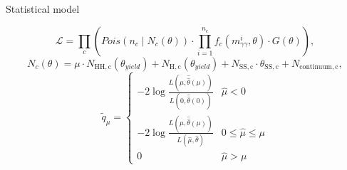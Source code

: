 \begin{frame}{Statistical model}

\begin{equation*}
    \mathcal{L}=\prod_{c}\left(Pois\left(n_{c}
    \mid N_{c}(\theta)\right) \cdot \prod_{i=1}^{n_{c}}
    f_{c}\left(m_{\gamma \gamma}^{i}, \theta\right) \cdot G(\theta)\right),
\end{equation*}
\begin{equation*}
    N_{c}(\theta)=\mu \cdot N_{\mathrm{HH},
    \mathrm{c}}\left(\theta_{yield }\right)+N_{\mathrm{H},
    \mathrm{c}}\left(\theta_{yield }\right)+N_{\mathrm{SS},
    \mathrm{c}} \cdot \theta_{\mathrm{SS},
    \mathrm{c}}+N_{\text{continuum} , \mathrm{c}},
\end{equation*}
\begin{equation*}
    \tilde{q}_{\mu}=\left\{\begin{array}{ll}
-2 \log \frac{L(\mu, \hat{\hat{\theta}}({\mu}))}{L(0, \hat{\hat{\theta}}(0))} & \hat{\mu}<0 \\
-2 \log \frac{L(\mu, \hat{\hat{\theta}}({\mu}))}{L(\hat{\mu}, \hat{\theta})} & 0 \leq \hat{\mu} \leq \mu \\
0 & \hat{\mu}>\mu
\end{array}\right.
\end{equation*}
\end{frame}

